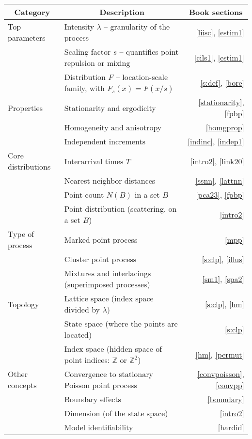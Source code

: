 \documentclass[10pt]{article}
\begin{document}
\begin{center}
\begin{tabular}{llr}
\hline
\multicolumn{1}{c}{Category} & \multicolumn{1}{c}{Description} & \multicolumn{1}{c}{Book sections} \\
\hline
\hline
Top parameters & Intensity $\lambda$ -- granularity of the process  &  \ref{liisc}, \ref{estim1}\\
 & Scaling factor $s$ -- quantifies point repulsion or mixing  &  \ref{cils1}, \ref{estim1}\\
 & Distribution $F$ -- location-scale family, with $F_s(x)=F(x/s)$ & \ref{s:def}, \ref{bore}\\
\hline
Properties &  Stationarity and ergodicity & \ref{stationarity}, \ref{fpbp}\\
 & Homogeneity and anisotropy & \ref{homgprop} \\
 & Independent increments &  \ref{indinc}, \ref{indep1}\\
\hline
Core distributions &  Interarrival times $T$ & \ref{intro2}, \ref{link20} \\
& Nearest neighbor distances  & \ref{ssnn}, \ref{lattnn}\\
 & Point count $N(B)$ in a set $B$  &  \ref{pca23}, \ref{fpbp}\\
 & Point distribution (scattering, on a set $B$) & \ref{intro2} \\
\hline
Type of process &  Marked point process & \ref{mpp} \\
& Cluster point process & \ref{s:clp}, \ref{illus}\\
 & Mixtures and interlacings (superimposed processes) & \ref{sm1}, \ref{spa2}\\
\hline
Topology & Lattice space (index space divided by $\lambda$) & \ref{s:clp}, \ref{hm} \\
  &State space  (where the points are located) & \ref{s:clp}\\
 & Index space (hidden space of point indices: $\mathbb{Z}$ or $\mathbb{Z}^2$) & \ref{hm}, \ref{permut}\\
\hline
Other concepts &  Convergence to stationary Poisson point process & \ref{convpoisson}, \ref{convpp}\\
   & Boundary effects  & \ref{boundary}\\
  & Dimension (of the state space) & \ref{intro2}\\
  & Model identifiability & \ref{hardid}\\
\hline
\end{tabular}
\end{center}
\end{document}
